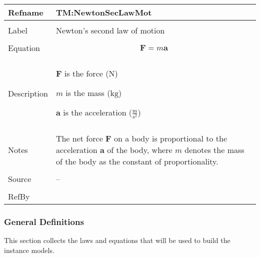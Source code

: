 \documentclass[12pt]{article}
\begin{document}
\begin{minipage}{\textwidth}
\begin{tabular}{>{\raggedright}p{}>{\raggedright\arraybackslash}p{}}
\toprule \textbf{Refname} & \textbf{TM:NewtonSecLawMot}
\label{TM:NewtonSecLawMot}
\\ \midrule \\
Label & Newton's second law of motion
        
\\ \midrule \\
Equation & \begin{displaymath}
           \symbf{F}=m \symbf{a}
           \end{displaymath}
\\ \midrule \\
Description & \begin{symbDescription}
              \item{$\symbf{F}$ is the force (${\text{N}}$)}
              \item{$m$ is the mass (${\text{kg}}$)}
              \item{$\symbf{a}$ is the acceleration ($\frac{\text{m}}{\text{s}^{2}}$)}
              \end{symbDescription}
\\ \midrule \\
Notes & The net force $\symbf{F}$ on a body is proportional to the acceleration $\symbf{a}$ of the body, where $m$ denotes the mass of the body as the constant of proportionality.
        
\\ \midrule \\
Source & --
         
\\ \midrule \\
RefBy & 
\\ \bottomrule
\end{tabular}
\end{minipage}
\subsubsection{General Definitions}
\label{Sec:GDs}
This section collects the laws and equations that will be used to build the instance models.
\end{document}
